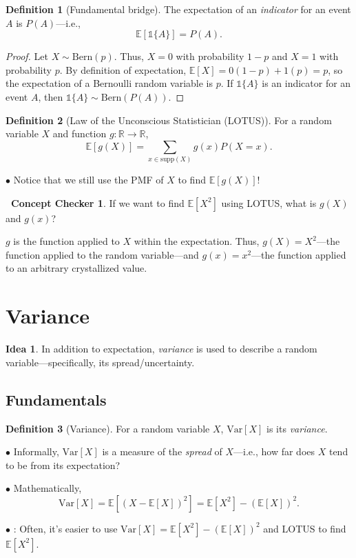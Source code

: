 \documentclass[12pt,oneside]{article}
\newcommand{\E}{\mathbb{E}}
\newcommand{\Var}{\text{Var}}
\newcommand{\supp}{\text{supp}}
\newcommand{\Bern}{\text{Bern}}
\newcommand{\R}{\mathbb{R}}
\newcommand{\indic}{\mathds{1}}
\newcommand{\tip}{\textbf{\faLightbulb}: }
\theoremstyle{definition}
\newtheorem{definition}{Definition}
\newtheorem{concept}{\faPen \ Concept Checker}
\newtheorem*{idea}{Idea}
\theoremstyle{remark}
\begin{document}
\begin{definition}[Fundamental bridge]
The expectation of an \textit{indicator} for an event $A$ is $P(A)$—i.e., \[\E[\indic\{A\}] = P(A).\]
\end{definition}

\begin{proof}
Let $X \sim \Bern(p)$. Thus, $X = 0$ with probability $1 - p$ and $X = 1$ with probability $p$. By definition of expectation, $\E[X] = 0 (1 - p) + 1 (p) = p$, so the expectation of a Bernoulli random variable is $p$. If $\indic\{A\}$ is an indicator for an event $A$, then $\indic\{A\} \sim \Bern(P(A))$.
\end{proof}

\begin{definition}[Law of the Unconscious Statistician (LOTUS)]
For a random variable $X$ and function $g: \R \rightarrow \R$, \[\E[g(X)] = \sum_{x \in \supp(X)} g(x) P(X = x).\]

$\bullet$ Notice that we still use the PMF of $X$ to find $\E[g(X)]$!
\end{definition}

\begin{concept}
If we want to find $\E[X^2]$ using LOTUS, what is $g(X)$ and $g(x)$?
\end{concept}

\begin{solutionbox}
$g$ is the function applied to $X$ within the expectation. Thus, $g(X) = X^2$—the function applied to the random variable—and $g(x) = x^2$—the function applied to an arbitrary crystallized value.
\end{solutionbox}

\section{Variance}

\begin{idea}
In addition to expectation, \textit{variance} is used to describe a random variable—specifically, its spread/uncertainty.
\end{idea}

\subsection{Fundamentals}

\begin{definition}[Variance]
For a random variable $X$, $\Var[X]$ is its \textit{variance}.

$\bullet$ Informally, $\Var[X]$ is a measure of the \textit{spread} of $X$—i.e., how far does $X$ tend to be from its expectation?

$\bullet$ Mathematically, \[\Var[X] = \E[(X - \E[X])^2] = \E[X^2] - (\E[X])^2.\]

$\bullet$ \tip Often, it's easier to use $\Var[X] = \E[X^2] - (\E[X])^2$ and LOTUS to find $\E[X^2]$.
\end{definition}
\end{document}

